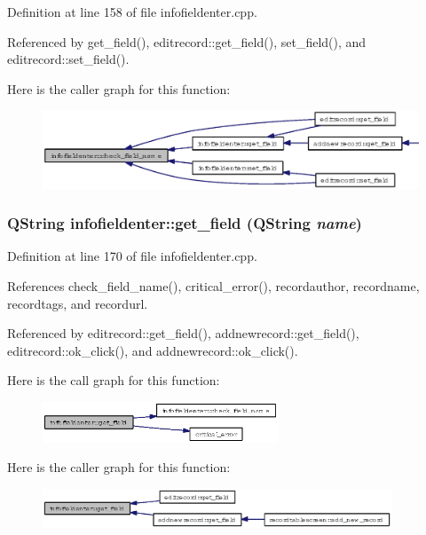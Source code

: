 Definition at line 158 of file infofieldenter.cpp.

Referenced by get\_\-field(), editrecord::get\_\-field(), set\_\-field(), and editrecord::set\_\-field().

Here is the caller graph for this function:\begin{figure}[H]
\begin{center}
\leavevmode
\includegraphics[width=404pt]{classinfofieldenter_1020b1777a4f93a10b5c04308625e62c_icgraph}
\end{center}
\end{figure}
\subsubsection{\setlength{\rightskip}{0pt plus 5cm}QString infofieldenter::get\_\-field (QString {\em name})}\label{classinfofieldenter_9ce895ba08dedfe227c839c56c2cb3b7}




Definition at line 170 of file infofieldenter.cpp.

References check\_\-field\_\-name(), critical\_\-error(), recordauthor, recordname, recordtags, and recordurl.

Referenced by editrecord::get\_\-field(), addnewrecord::get\_\-field(), editrecord::ok\_\-click(), and addnewrecord::ok\_\-click().

Here is the call graph for this function:\begin{figure}[H]
\begin{center}
\leavevmode
\includegraphics[width=199pt]{classinfofieldenter_9ce895ba08dedfe227c839c56c2cb3b7_cgraph}
\end{center}
\end{figure}


Here is the caller graph for this function:\begin{figure}[H]
\begin{center}
\leavevmode
\includegraphics[width=295pt]{classinfofieldenter_9ce895ba08dedfe227c839c56c2cb3b7_icgraph}
\end{center}
\end{figure}
